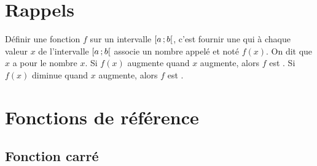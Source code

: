 \documentclass[12pt,a4paper]{article}
\date{}
\title{}
\begin{document}
	
	\section{Rappels}
	
	
	
	\begin{mydefs}
		
		Définir une fonction $f$ sur un intervalle $\mbox{\ensuremath{\left[a\mathpunct{};b\right[}}$, c'est fournir une  qui à chaque valeur $x$ de l'intervalle $\mbox{\ensuremath{\left[a\mathpunct{};b\right[}}$ associe un nombre appelé  et noté $f(x)$.
		On dit que $x$ a pour   le nombre $x$.
		Si $f(x)$ augmente quand $x$ augmente, alors $f$ est .
		Si $f(x)$ diminue quand $x$ augmente, alors $f$ est .
		
		
	\end{mydefs}
	
	
	
	\section{Fonctions de référence}
	
	\subsection{Fonction carré}
	
\end{document}
